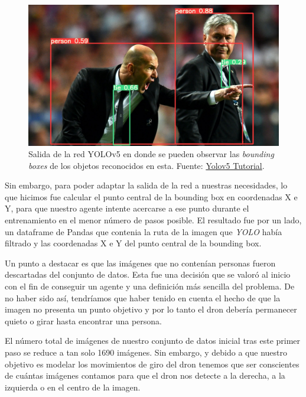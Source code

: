 \begin{figure}[ht!]
    \centering
    \includegraphics[width=1\linewidth]{figuras/yolov5_output_example.jpeg}
    \caption[Visualización de la salida de la red YOLO]{Salida de la red YOLOv5 en donde se pueden observar las \textit{bounding boxes} de los objetos reconocidos en esta. Fuente: \href{https://colab.research.google.com/github/ultralytics/yolov5/blob/master/tutorial.ipynb}{Yolov5 Tutorial}.}
    \label{fig-yolov5-output-example}
\end{figure}

Sin embargo, para poder adaptar la salida de la red a nuestras necesidades, lo que hicimos fue calcular el punto central de la bounding box en coordenadas X e Y, para que nuestro agente intente acercarse a ese punto durante el entrenamiento en el menor número de pasos posible.
El resultado fue por un lado, un dataframe de Pandas que contenia la ruta de la imagen que \textit{YOLO} había filtrado y las coordenadas X e Y del punto central de la bounding box.
\medskip

Un punto a destacar es que las imágenes que no contenían personas fueron descartadas del conjunto de datos. Esta fue una decisión que se valoró al inicio con el fin de conseguir un agente y una definición más sencilla del problema. De no haber sido así, tendríamos que haber tenido en cuenta el hecho de que la imagen no presenta un punto objetivo y por lo tanto el dron debería permanecer quieto o girar hasta encontrar una persona.
\medskip

El número total de imágenes de nuestro conjunto de datos inicial tras este primer paso se reduce a tan solo 1690 imágenes. Sin embargo, y debido a que nuestro objetivo es modelar los movimientos de giro del dron tenemos que ser conscientes de cuántas imágenes contamos para que el dron nos detecte a la derecha, a la izquierda o en el centro de la imagen.
\medskip

